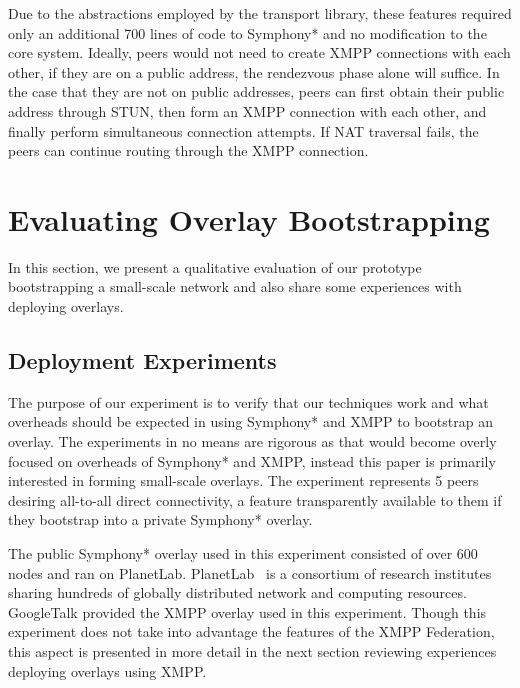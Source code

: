 \documentclass[conference]{IEEEtran}
\begin{document}
Due to the abstractions employed by the transport library, these features
required only an additional 700 lines of code to Symphony* and no modification to
the core system.  Ideally, peers would not need to create XMPP connections with
each other, if they are on a public address, the rendezvous phase alone will
suffice.  In the case that they are not on public addresses, peers can first
obtain their public address through STUN, then form an XMPP connection with
each other, and finally perform simultaneous connection attempts.  If NAT
traversal fails, the peers can continue routing through the XMPP connection.

\section{Evaluating Overlay Bootstrapping}
\label{evaluations}
In this section, we present a qualitative evaluation of our prototype
bootstrapping a small-scale network and also share some experiences with
deploying overlays.

\subsection{Deployment Experiments}

The purpose of our experiment is to verify that our techniques work and what
overheads should be expected in using Symphony* and XMPP to bootstrap an overlay.
The experiments in no means are rigorous as that would become overly focused on
overheads of Symphony* and XMPP, instead this paper is primarily interested in
forming small-scale overlays.  The experiment represents 5 peers desiring
all-to-all direct connectivity, a feature transparently available to them if
they bootstrap into a private Symphony* overlay.

The public Symphony* overlay used in this experiment consisted of over 600 nodes
and ran on PlanetLab.  PlanetLab~\cite{planetlab} is a consortium of research
institutes sharing hundreds of globally distributed network and computing
resources.  GoogleTalk provided the XMPP overlay used in this experiment.
Though this experiment does not take into advantage the features of the XMPP
Federation, this aspect is presented in more detail in the next section
reviewing experiences deploying overlays using XMPP.
\end{document}
